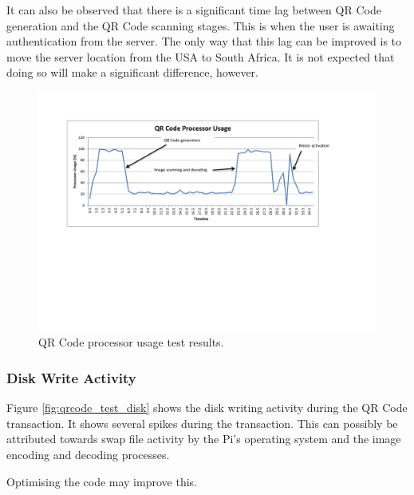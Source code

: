 It can also be observed that there is a significant time lag between QR Code generation
and the QR Code scanning stages. This is when the user is awaiting authentication from the
server. The only way that this lag can be improved is to move the server location from the
USA to South Africa. It is not expected that doing so will make a significant
difference, however.

\begin{figure}
 \centering 
 \includegraphics[clip=true, trim = 70 260 0 70,
 scale=0.7]{qrcode_test_cpu}
 \caption{QR Code processor usage test results.}
 \label{fig:qrcode_test_cpu}
\end{figure}

\subsubsection{Disk Write Activity}

Figure \ref{fig:qrcode_test_disk} shows the disk writing activity during the QR Code
transaction. It shows several spikes during the transaction. This can possibly be
attributed towards swap file activity by the Pi's operating system and the image encoding
and decoding processes.

Optimising the code may improve this.


